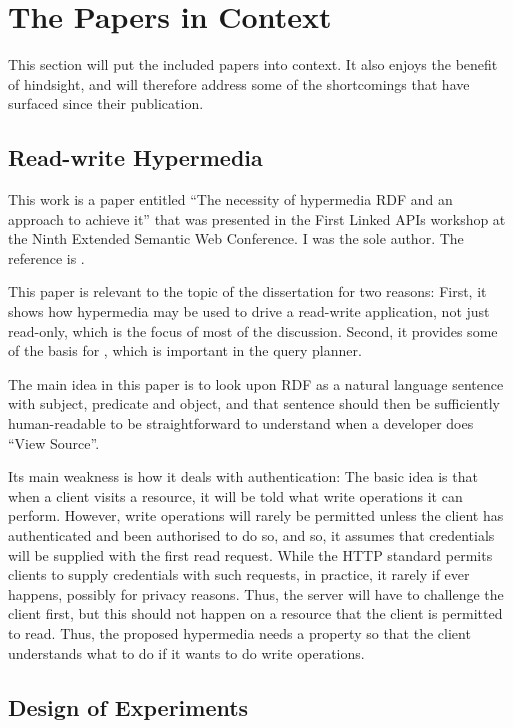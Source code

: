 \section{The Papers in Context}\label{sec:papersincontext}

This section will put the included papers into context. It also enjoys
the benefit of hindsight, and will therefore address some of the
shortcomings that have surfaced since their publication.

\subsection{Read-write Hypermedia}\label{sec:conlapis}

This work is a paper entitled ``The necessity of hypermedia RDF and an
approach to achieve it'' that was presented in the First Linked APIs
workshop at the Ninth Extended Semantic Web Conference. I was the sole
author. The reference is \cite{kjernsmo_lapis_2012}.

This paper is relevant to the topic of the dissertation for two
reasons: First, it shows how hypermedia may be used to drive a
read-write application, not just read-only, which is the focus of most
of the discussion. Second, it provides some of the basis for
\cite{ldf1}, which is important in the query planner.

The main idea in this paper is to look upon RDF as a natural language
sentence with subject, predicate and object, and that sentence should
then be sufficiently human-readable to be straightforward to
understand when a developer does ``View Source''.

Its main weakness is how it deals with authentication: The basic idea
is that when a client visits a resource, it will be told what
write operations it can perform. However, write operations will rarely
be permitted unless the client has authenticated and been authorised
to do so, and so, it assumes that credentials will be supplied with
the first read request. While the HTTP standard permits clients to
supply credentials with such requests, in practice, it rarely if ever
happens, possibly for privacy reasons. Thus, the server will have to
challenge the client first, but this should not happen on a resource
that the client is permitted to read. Thus, the proposed hypermedia
needs a property so that the client understands what to do if it wants
to do write operations.

\subsection{Design of Experiments}\label{sec:condoe}

